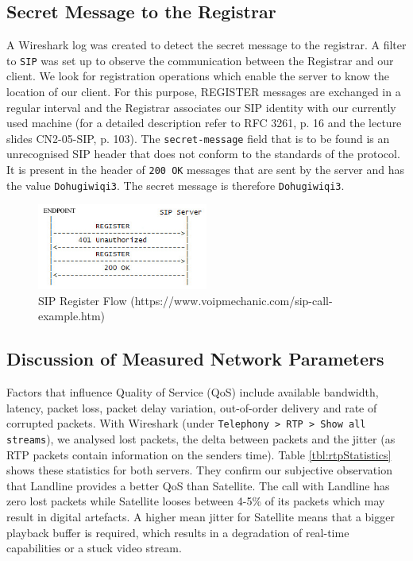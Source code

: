 \documentclass[parskip=full]{scrartcl}
\begin{document}
\subsection{Secret Message to the Registrar}
A Wireshark log was created to detect the secret message to the registrar.
A filter to \texttt{SIP} was set up to observe the communication between the Registrar and our client.
We look for registration operations which enable the server to know the location of our client.
For this purpose, REGISTER messages are exchanged in a regular interval and the Registrar associates our SIP identity with our currently used machine (for a detailed description refer to RFC 3261, p. 16 and the lecture slides CN2-05-SIP, p. 103).
The \texttt{secret-message} field that is to be found is an unrecognised SIP header that does not conform to the standards of the protocol.
It is present in the header of \texttt{200 OK} messages that are sent by the server and has the value \texttt{Dohugiwiqi3}.
The secret message is therefore \texttt{Dohugiwiqi3}.
\begin{figure}[ht]
    \centering
   \includegraphics[width=0.5\textwidth]{images/sip_register_flow.jpg} 
    \caption{SIP Register Flow (https://www.voipmechanic.com/sip-call-example.htm)}
    \label{fig:sipRegisterFlow}
\end{figure}
\subsection{Discussion of Measured Network Parameters}
Factors that influence Quality of Service (QoS) include available bandwidth, latency, packet loss, packet delay variation, out-of-order delivery and rate of corrupted packets. 
With Wireshark (under \texttt{Telephony > RTP > Show all streams}), we analysed lost packets, the delta between packets and the jitter (as RTP packets contain information on the senders time).
Table \ref{tbl:rtpStatistics} shows these statistics for both servers.
They confirm our subjective observation that Landline provides a better QoS than Satellite.
The call with Landline has zero lost packets while Satellite looses between 4-5\% of its packets which may result in digital artefacts. 
A higher mean jitter for Satellite means that a bigger playback buffer is required, which results in a degradation of real-time capabilities or a stuck video stream. %
\end{document}
